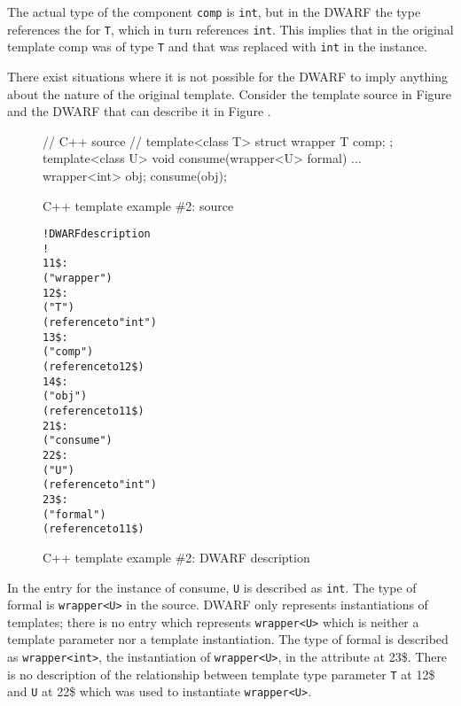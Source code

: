 The actual type of the component \texttt{comp} is \texttt{int}, but in the DWARF
the type references the
\DWTAGtemplatetypeparameter{}
for \texttt{T}, which in turn references \texttt{int}. This implies that in the
original template comp was of type \texttt{T} and that was replaced
with \texttt{int} in the instance. 

There exist situations where it is
not possible for the DWARF to imply anything about the nature
of the original template. 
Consider the  template source in
Figure 
and the DWARF that can describe it in
Figure .

\begin{figure}[!ht]
\begin{nlnlisting}
// C++ source
//
    template<class T>
    struct wrapper {
        T comp;
    };
    template<class U>
    void consume(wrapper<U> formal)
    {
        ...
    }
    wrapper<int> obj;
    consume(obj);
\end{nlnlisting}
\caption{C++ template example \#2: source}
\label{fig:ctemplateexample2source}
\end{figure}

\begin{figure}[ht]
\begin{dwflisting}
\begin{alltt}
! DWARF description
!
11\$:  \DWTAGstructuretype
          \DWATname("wrapper")
12\$:      \DWTAGtemplatetypeparameter
              \DWATname("T")
              \DWATtype(reference to "int")
13\$:      \DWTAGmember
              \DWATname("comp")
              \DWATtype(reference to 12\$)
14\$:  \DWTAGvariable
          \DWATname("obj")
          \DWATtype(reference to 11\$)
21\$:  \DWTAGsubprogram
          \DWATname("consume")
22\$:      \DWTAGtemplatetypeparameter
              \DWATname("U")
              \DWATtype(reference to "int")
23\$:      \DWTAGformalparameter
              \DWATname("formal")
              \DWATtype(reference to 11\$)
\end{alltt}
\end{dwflisting}
\caption{C++ template example \#2: DWARF description}
\label{fig:ctemplateexample2dwarf}
\end{figure}

In the \DWTAGsubprogram{} 
entry for the instance of consume, \texttt{U} is described as \texttt{int}. 
The type of formal is \texttt{wrapper\textless U\textgreater} in
the source. DWARF only represents instantiations of templates;
there is no entry which represents \texttt{wrapper\textless U\textgreater} 
which is neither
a template parameter nor a template instantiation. The type
of formal is described as \texttt{wrapper\textless int\textgreater},
the instantiation of \texttt{wrapper\textless U\textgreater},
in the \DWATtype{} attribute at 
23\$. 
There is no
description of the relationship between template type parameter
\texttt{T} at 12\$ and \texttt{U} at 22\$ which was used to instantiate
\texttt{wrapper\textless U\textgreater}.

